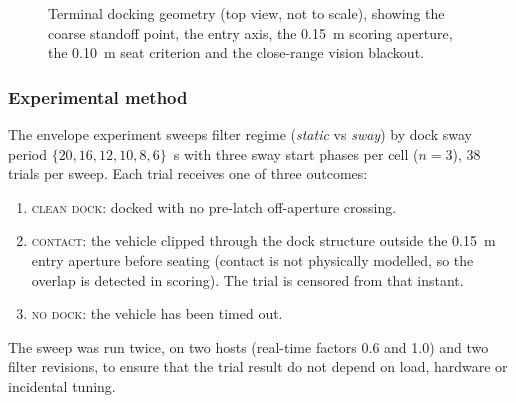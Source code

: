 \begin{figure}[H]
    \centering
    
    \caption{Terminal docking geometry (top view, not to scale), showing the coarse
        standoff point, the entry axis, the 0.15~m scoring aperture, the
        0.10~m seat criterion and the close-range vision blackout.}
    \label{fig:geometry}
\end{figure}

\subsubsection{Experimental method}
\label{sec:method-experiment}

The envelope experiment sweeps filter regime (\emph{static} vs \emph{sway}) by dock sway period $\{20, 16, 12, 10, 8, 6\}$~s with three sway start phases per cell ($n{=}3$), 38 trials per sweep. Each trial receives one of three outcomes:
\begin{enumerate}
    \item \textsc{clean dock}: docked with no pre-latch off-aperture crossing.
    \item \textsc{contact}: the vehicle clipped through the dock structure outside
          the 0.15~m entry aperture before seating (contact is not physically
          modelled, so the overlap is detected in scoring). The trial is censored
          from that instant.
    \item \textsc{no dock}: the vehicle has been timed out.
\end{enumerate}
The sweep was run twice, on two hosts (real-time factors 0.6 and 1.0) and two filter revisions, to ensure that the trial result do not depend on load, hardware or incidental tuning.

